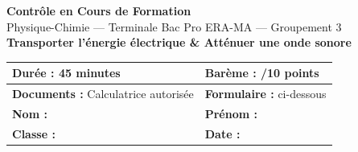 \documentclass[a4paper,11pt]{article}
\begin{document}
\begin{center}
{\LARGE\bfseries\color{vertpro} Contrôle en Cours de Formation}\\[8pt]
{\large Physique-Chimie — Terminale Bac Pro ERA-MA — Groupement 3}\\[12pt]
{\Large\bfseries Transporter l'énergie électrique \& Atténuer une onde sonore}\\[20pt]

\begin{tabular}{|p{6cm}|p{6cm}|}
\hline
\textbf{Durée :} 45 minutes & \textbf{Barème :} /10 points \\
\hline
\textbf{Documents :} Calculatrice autorisée & \textbf{Formulaire :} ci-dessous \\
\hline
\textbf{Nom :} \dotfill & \textbf{Prénom :} \dotfill \\
\hline
\textbf{Classe :} \dotfill & \textbf{Date :} \dotfill \\
\hline
\end{tabular}
\end{center}

\vspace{10pt}
\end{document}

